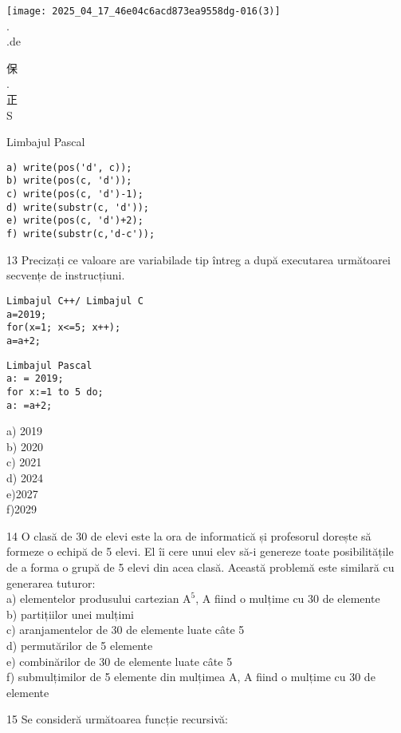 \texttt{[image: 2025\_04\_17\_46e04c6acd873ea9558dg-016(3)]}\\
.\\
.de

保\\
.\\
正\\
$\qquad$\\
S

Limbajul Pascal

\begin{verbatim}
a) write(pos('d', c));
b) write(pos(c, 'd'));
c) write(pos(c, 'd')-1);
d) write(substr(c, 'd'));
e) write(pos(c, 'd')+2);
f) write(substr(c,'d-c'));
\end{verbatim}

13 Precizați ce valoare are variabilade tip întreg a după executarea următoarei secvențe de instrucțiuni.

\begin{verbatim}
Limbajul C++/ Limbajul C
a=2019;
for(x=1; x<=5; x++);
a=a+2;
\end{verbatim}

\begin{verbatim}
Limbajul Pascal
a: = 2019;
for x:=1 to 5 do;
a: =a+2;
\end{verbatim}

a) 2019\\
b) 2020\\
c) 2021\\
d) 2024\\
e)2027\\
f)2029

14 O clasă de 30 de elevi este la ora de informatică și profesorul dorește să formeze o echipă de 5 elevi. El îi cere unui elev să-i genereze toate posibilitățile de a forma o grupă de 5 elevi din acea clasă. Această problemă este similară cu generarea tuturor:\\
a) elementelor produsului cartezian $\mathrm{A}^{5}$, A fiind o mulțime cu 30 de elemente\\
b) partițiilor unei mulțimi\\
c) aranjamentelor de 30 de elemente luate câte 5\\
d) permutărilor de 5 elemente\\
e) combinărilor de 30 de elemente luate câte 5\\
f) submulțimilor de 5 elemente din mulțimea A, A fiind o mulțime cu 30 de elemente

15 Se consideră următoarea funcție recursivă:

